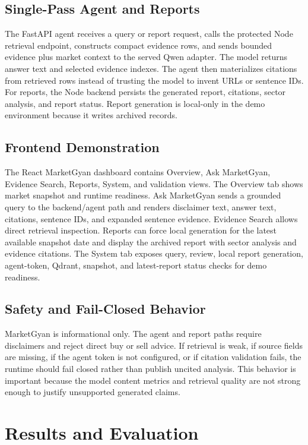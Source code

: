 \documentclass[12pt,a4paper]{report}
\begin{document}
\section{Single-Pass Agent and Reports}
The FastAPI agent receives a query or report request, calls the protected Node retrieval endpoint, constructs compact evidence rows, and sends bounded evidence plus market context to the served Qwen adapter. The model returns answer text and selected evidence indexes. The agent then materializes citations from retrieved rows instead of trusting the model to invent URLs or sentence IDs. For reports, the Node backend persists the generated report, citations, sector analysis, and report status. Report generation is local-only in the demo environment because it writes archived records.

\section{Frontend Demonstration}
The React MarketGyan dashboard contains Overview, Ask MarketGyan, Evidence Search, Reports, System, and validation views. The Overview tab shows market snapshot and runtime readiness. Ask MarketGyan sends a grounded query to the backend/agent path and renders disclaimer text, answer text, citations, sentence IDs, and expanded sentence evidence. Evidence Search allows direct retrieval inspection. Reports can force local generation for the latest available snapshot date and display the archived report with sector analysis and evidence citations. The System tab exposes query, review, local report generation, agent-token, Qdrant, snapshot, and latest-report status checks for demo readiness.

\section{Safety and Fail-Closed Behavior}
MarketGyan is informational only. The agent and report paths require disclaimers and reject direct buy or sell advice. If retrieval is weak, if source fields are missing, if the agent token is not configured, or if citation validation fails, the runtime should fail closed rather than publish uncited analysis. This behavior is important because the model content metrics and retrieval quality are not strong enough to justify unsupported generated claims.

\chapter{Results and Evaluation}
\end{document}

